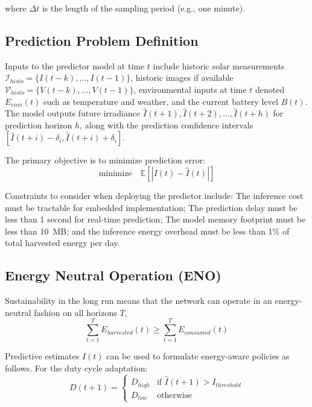 \documentclass[journal]{IEEEtran}
\begin{document}
where $\Delta t$ is the length of the sampling period (e.g., one minute).

\subsection{Prediction Problem Definition}

Inputs to the predictor model at time $t$ include historic solar measurements $\mathcal{I}_{histo} = \{I(t-k), \ldots, I(t-1)\}$, historic images if available $\mathcal{V}_{histo} = \{V(t-k), \ldots, V(t-1)\}$, environmental inputs at time $t$ denoted $E_{envi}(t)$ such as temperature and weather, and the current battery level $B(t)$. The model outputs future irradiance $\hat{I}(t+1), \hat{I}(t+2), \ldots, \hat{I}(t+h)$ for prediction horizon $h$, along with the prediction confidence intervals $[\hat{I}(t+i) - \delta_i, \hat{I}(t+i) + \delta_i]$.

The primary objective is to minimize prediction error:
\begin{equation}
\text{minimize} \quad \mathbb{E}\left[|I(t) - \hat{I}(t)|\right]
\end{equation}

Constraints to consider when deploying the predictor include: The inference cost must be tractable for embedded implementation; The prediction delay must be less than 1 second for real-time prediction; The model memory footprint must be less than 10~MB; and the inference energy overhead must be less than 1\% of total harvested energy per day.

\subsection{Energy Neutral Operation (ENO)}

Sustainability in the long run means that the network can operate in an energy-neutral fashion on all horizons $T$,\cite{ref8}
\begin{equation}
\sum_{t=1}^{T} E_{harvested}(t)  \geq  \sum_{t=1}^{T} E_{consumed}(t)
\end{equation}

Predictive estimates $\hat{I}(t)$ can be used to formulate energy-aware policies as follows. For the duty cycle adaptation:
\begin{equation}
D(t+1) = \begin{cases}
D_{high} & \text{if } \hat{I}(t+1) > I_{threshold} \\
D_{low} & \text{otherwise}
\end{cases}
\end{equation}
\end{document}
